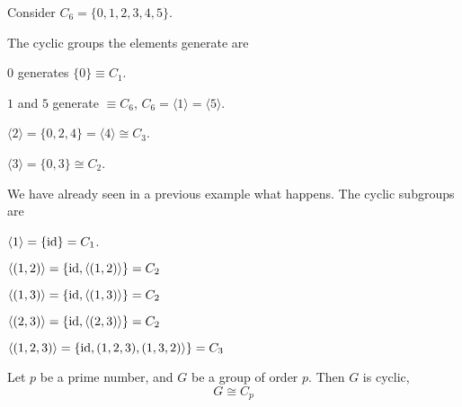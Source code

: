 \begin{example}
    Consider $C_6 = \{ 0, 1, 2, 3, 4, 5 \}$.

    The cyclic groups the elements generate are
    \begin{listu}
        \item $0$ generates $\{ 0 \} \equiv C_1$.
        \item $1$ and $5$ generate $\equiv C_6$, $C_6 = \langle 1 \rangle = \langle 5 \rangle$.
        \item $\langle 2 \rangle = \{ 0, 2, 4\} = \langle 4 \rangle \cong C_3$. 
        \item $\langle 3 \rangle = \{ 0, 3 \} \cong C_2$.
    \end{listu}
\end{example}

\begin{example}
    We have already seen in a previous example what happens. The cyclic subgroups are

    \begin{listu}
        \item $\langle 1 \rangle = \{ \mathrm{id} \} = C_1$.
        \item $\langle (1, 2) \rangle = \{ \mathrm{id}, \langle (1, 2) \rangle \} = C_2$
        \item $\langle (1, 3) \rangle = \{ \mathrm{id}, \langle (1, 3) \rangle \} = C_2$
        \item $\langle (2, 3) \rangle = \{ \mathrm{id}, \langle (2, 3) \rangle \} = C_2$
        \item $\langle (1, 2, 3) \rangle = \{ \mathrm{id}, (1, 2, 3), (1, 3, 2) \rangle \} = C_3$
    \end{listu}
\end{example}

\begin{proposition}
    Let $p$ be a prime number, and $G$ be a group of order $p$. Then $G$ is cyclic, \[
        G \cong C_p
    \]
\end{proposition}

